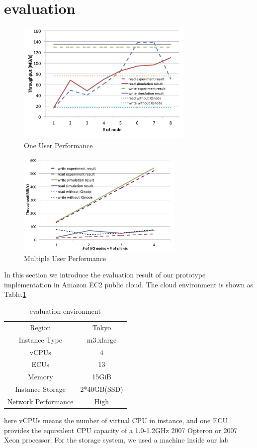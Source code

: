\section{evaluation}
\label{sec:evaluation}

\begin{figure}
\centering
\includegraphics[width=8.5cm]{img/one_client.pdf}
\caption{One User Performance}
\label{evaluation:one user}
\end{figure}

\begin{figure}
\centering
\includegraphics[width=8cm]{img/multiple_client.pdf}
\caption{Multiple User Performance}
\label{evaluation:multi user}
\end{figure}

In this section we introduce the evaluation result of our prototype implementation in Amazon EC2 public cloud.
The cloud environment is shown as Table.\ref{evaluation:environment}
\begin{table}[h]
\centering
\begin{tabular}{|c|c|}
Region				&		Tokyo		\\
Instance Type		&		m3.xlarge	\\
vCPUs				&		4			\\
ECUs				&		13			\\
Memory				&		15GiB		\\
Instance Storage	&		2*40GB(SSD)	\\
Network Performance	&		High		\\
\end{tabular}
\caption{evaluation environment}
\label{evaluation:environment}
\end{table}
here vCPUs means the number of virtual CPU in instance, and one ECU provides the equivalent CPU capacity of a 1.0-1.2GHz 2007 Opteron or 2007 Xeon processor.
For the storage system, we used a machine inside our lab

